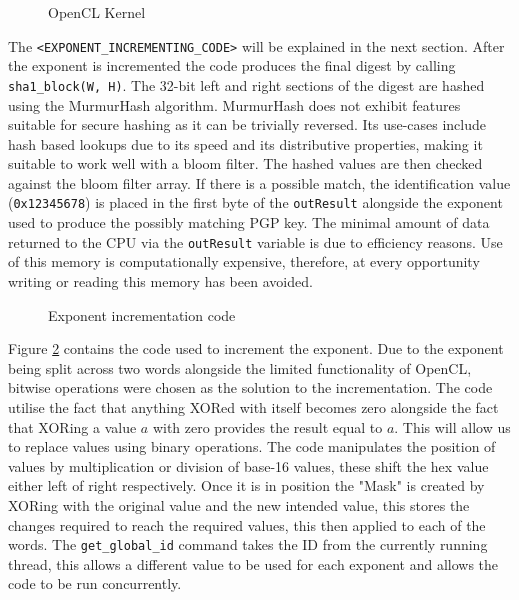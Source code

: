 \begin{figure}[!h]
  \centering
  
  \caption{OpenCL Kernel}
  \label{fig:opencl}
\end{figure}

The \verb|<EXPONENT_INCREMENTING_CODE>| will be explained in the next section. After the exponent is incremented the code produces the final digest by calling \verb|sha1_block(W, H)|. The 32-bit left and right sections of the digest are hashed using the MurmurHash algorithm. MurmurHash does not exhibit features suitable for secure hashing as it can be trivially reversed. Its use-cases include hash based lookups due to its speed and its distributive properties, making it suitable to work well with a bloom filter. The hashed values are then checked against the bloom filter array. If there is a possible match, the identification value (\verb|0x12345678|) is placed in the first byte of the \verb|outResult| alongside the exponent used to produce the possibly matching PGP key. The minimal amount of data returned to the CPU via the \verb|outResult| variable is due to efficiency reasons. Use of this memory is computationally expensive, therefore, at every opportunity writing or reading this memory has been avoided.

\begin{figure}[!h]
  \centering
  
  \caption{Exponent incrementation code}
  \label{fig:increment}
\end{figure}

Figure \ref{fig:increment} contains the code used to increment the exponent. Due to the exponent being split across two words alongside the limited functionality of OpenCL, bitwise operations were chosen as the solution to the incrementation. The code utilise the fact that anything XORed with itself becomes zero alongside the fact that XORing a value $a$ with zero provides the result equal to $a$. This will allow us to replace values using binary operations. The code manipulates the position of values by multiplication or division  of base-16 values, these shift the hex value either left of right respectively. Once it is in position the "Mask" is created by XORing with the original value and the new intended value, this stores the changes required to reach the required values, this then applied to each of the words.
The \verb|get_global_id| command takes the ID from the currently running thread, this allows a different value to be used for each exponent and allows the code to be run concurrently.

